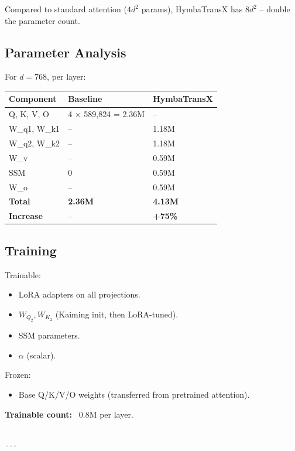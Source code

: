 Compared to standard attention ($4 d^2$ params), HymbaTransX has \textbf{$8 d^2$} -- 
double the parameter count.

\subsection{Parameter Analysis}

For $d = 768$, per layer:

\begin{table}[H]
\centering
\small
\begin{tabular}{lll}
\toprule
\textbf{Component} & \textbf{Baseline} & \textbf{HymbaTransX} \\
\midrule
Q, K, V, O & 4 $\times$ 589,824 = 2.36M & -- \\
W\_q1, W\_k1 & -- & 1.18M \\
W\_q2, W\_k2 & -- & 1.18M \\
W\_v & -- & 0.59M \\
SSM & 0 & 0.59M \\
W\_o & -- & 0.59M \\
\textbf{Total} & \textbf{2.36M} & \textbf{4.13M} \\
\textbf{Increase} & -- & \textbf{+75\%} \\
\bottomrule
\end{tabular}
\end{table}

\subsection{Training}

Trainable:
\begin{itemize}
\item LoRA adapters on all projections.
\item $W_{Q_2}, W_{K_2}$ (Kaiming init, then LoRA-tuned).
\item SSM parameters.
\item $\alpha$ (scalar).

\end{itemize}
Frozen:
\begin{itemize}
\item Base Q/K/V/O weights (transferred from pretrained attention).

\end{itemize}
\textbf{Trainable count:} ~0.8M per layer.
\begin{lstlisting}

---
\end{lstlisting}

